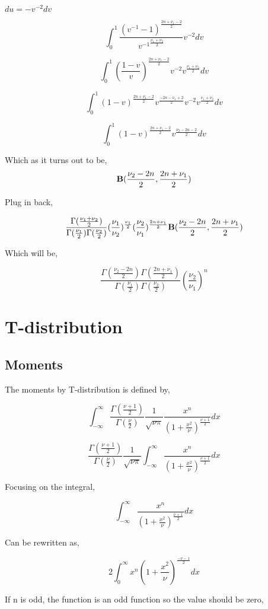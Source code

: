 \documentclass{article}
\begin{document}
$du = -v^{-2} dv$

$$\int_{0}^{1} \frac{(v^{-1}-1)^{\frac{2n+\nu_1-2}{2}}}{{v^{-1}}^{\frac{\nu_1+\nu_2}{2}}}v^{-2} dv$$

$$\int_{0}^{1} (\frac{1-v}{v})^{\frac{2n+\nu_1-2}{2}}v^{-2} {{{v}^{\frac{\nu_1+\nu_2}{2}}}} dv$$

$$\int_{0}^{1} ({1-v})^{\frac{2n+\nu_1-2}{2}}v^{\frac{-2n-\nu_1+2}{2}}v^{-2} {{{v}^{\frac{\nu_1+\nu_2}{2}}}} dv$$

$$\int_{0}^{1} ({1-v})^{\frac{2n+\nu_1-2}{2}}v^{\frac{\nu_2-2n-2}{2}}{} dv$$

Which as it turns out to be, 
$${\bf B}(\frac{\nu_2-2n}{2},\frac{2n+\nu_1}{2})$$

Plug in back,

$$\frac{\Gamma(\frac{\nu_1+\nu_2}{2})}{\Gamma(\frac{\nu_1}{2})\Gamma(\frac{\nu_2}{2})} (\frac{\nu_1}{\nu_2})^{\frac{\nu_1}{2}}(\frac{\nu_2}{\nu_1})^{\frac{2n+\nu_1}{2}} {\bf B}(\frac{\nu_2-2n}{2},\frac{2n+\nu_1}{2})$$

Which will be,

$$\frac{\Gamma(\frac{\nu_2-2n}{2})\Gamma(\frac{2n+\nu_1}{2})}{\Gamma(\frac{\nu_1}{2})\Gamma(\frac{\nu_2}{2})} (\frac{\nu_2}{\nu_1})^{n} $$

\section{T-distribution}

\subsection{Moments}
The moments by T-distribution is defined by,

$$\int_{-\infty}^{\infty}\frac{\Gamma(\frac{\nu+1}{2})}{\Gamma(\frac{\nu}{2})} \frac{1}{\sqrt{\nu \pi}} \frac{x^n}{(1+\frac{x^2}{\nu})^{\frac{\nu+1}{2}}}dx$$

$$\frac{\Gamma(\frac{\nu+1}{2})}{\Gamma(\frac{\nu}{2})} \frac{1}{\sqrt{\nu \pi}} \int_{-\infty}^{\infty} \frac{x^n}{(1+\frac{x^2}{\nu})^{\frac{\nu+1}{2}}}dx$$

Focusing on the integral, 

$$\int_{-\infty}^{\infty} \frac{x^n}{(1+\frac{x^2}{\nu})^{\frac{\nu+1}{2}}}dx$$

Can be rewritten as,

$$2 \int_{0}^{\infty} x^n {(1+\frac{x^2}{\nu})^{\frac{-\nu-1}{2}}} dx$$

If n is odd, the function is an odd function so the value should be zero,
\end{document}

